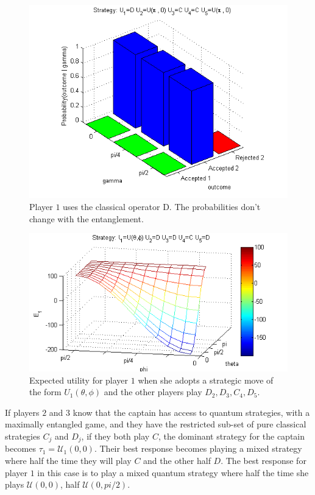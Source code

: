 \documentclass[10pt]{llncs}
\begin{document}
\begin{figure}[h!]
\centering 
\includegraphics[scale=0.50]{Figures/1.5qubit/DUpi0CCUpi0.png}
\caption{Player $1$ uses the classical operator D. The probabilities don't change with the entanglement.  }
\label{fig:pg_3players_99_0_1:2}
\end{figure}

\begin{figure}[h!]
\centering 
\includegraphics[scale=0.50]{Figures/1.5qubit/meanpirate.png}
\caption{Expected utility for player $1$ when she adopts a strategic move of the form $U_{1}(\theta,\phi)$ and the other players play $D_{2},D_{3},C_{4},D_{5}$. }
\label{fig:pg_3players_99_0_1:4}
\end{figure}

If players $2$ and $3$ know that the captain has access to quantum strategies, with a maximally entangled game, and they have the restricted sub-set of pure classical strategies $C_{j}$ and $D_{j}$, if they both play $C$, the dominant strategy for the captain becomes $\tau_{1} = \mathcal{U}_{1}(0,0)$. Their best response becomes playing a mixed strategy where half the time they will play $C$ and the other half $D$. The best response for player $1$ in this case is to play a mixed quantum strategy where half the time she plays $\mathcal{U}(0,0)$, half $\mathcal{U}(0,pi/2)$.
\end{document}
